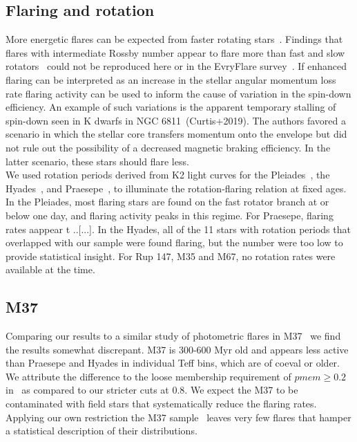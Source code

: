 \documentclass{aa}
\begin{document}
\subsection{Flaring and rotation}
More energetic flares can be expected from faster rotating stars~\citep{candelaresi_superflare_2014, doorsselaere_stellar_2017, yang_flaring_2017}. Findings that flares with intermediate Rossby number appear to flare more than fast and slow rotators~\citep{mondrik_flarerotation_2019} could not be reproduced here or in the EvryFlare survey~\citep{howard_evryflare2arxiv_2019}. If enhanced flaring can be interpreted as an increase in the stellar angular momentum loss rate flaring activity can be used to inform the cause of variation in the spin-down efficiency. An example of such variations is the apparent temporary stalling of spin-down seen in K dwarfs in NGC 6811~(Curtis+2019). The authors favored a scenario in which the stellar core transfers momentum onto the envelope but did not rule out the possibility of a decreased magnetic braking efficiency. In the latter scenario, these stars should flare less. %
\\
We used rotation periods derived from K2 light curves for the Pleiades~\citep{rebull_pleiadesrot_2016}, the Hyades~\citep{douglas_hyadesrot_2016}, and Praesepe~\citep{rebull_praesepe_2017}, to illuminate the rotation-flaring relation at fixed ages. In the Pleiades, most flaring stars are found on the fast rotator branch at or below one day, and flaring activity peaks in this regime. For Praesepe, flaring rates aappear t ..[...]. In the Hyades, all of the 11 stars with rotation periods that overlapped with our sample were found flaring, but the number were too low to provide statistical insight. For Rup 147, M35 and M67, no rotation rates were available at the time.
 \subsection{M37}
Comparing our results to a similar study of photometric flares in M37~\citep{chang_photometric_2015} we find the results somewhat discrepant. M37 is 300-600 Myr old and appears less active than Praesepe and Hyades in individual Teff bins, which are of coeval or older. We attribute the difference to the loose membership requirement of $pmem \geq 0.2$ in~\cite{chang_photometric_2015} as compared to our stricter cuts at 0.8. We expect the M37 to be contaminated with field stars that systematically reduce the flaring rates. Applying our own restriction the M37 sample~\citep{chang_photometric_2015_data} leaves very few flares that hamper a statistical description of their distributions.
\end{document}
